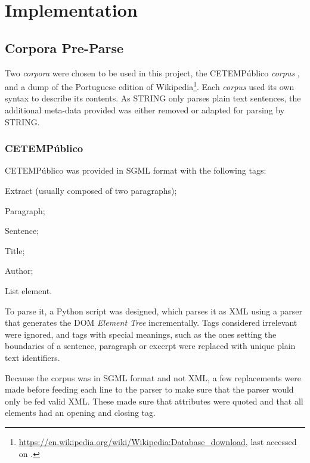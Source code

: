 \chapter{Implementation}
\label{ch:implementation}

\section{Corpora Pre-Parse}

Two \emph{corpora} were chosen to be used in this project, the CETEMPúblico 
\emph{corpus} \citep{rocha2000cetempublico}, and a dump of the Portuguese 
edition of 
Wikipedia\footnote{\url{https://en.wikipedia.org/wiki/Wikipedia:Database_download}, last accessed on .}. Each \emph{corpus} used its own 
syntax to describe its contents. As \ac{STRING} only parses plain text 
sentences, the additional meta-data provided was either removed or adapted for 
parsing by \ac{STRING}.

\subsection{CETEMPúblico}

CETEMPúblico was provided in \ac{SGML} format with the following tags:

\begin{description}[labelwidth=3em]
 \item [\texttt{ext}] Extract (usually composed of two paragraphs);
 \item [\texttt{p}]   Paragraph;
 \item [\texttt{s}]   Sentence;
 \item [\texttt{t}]   Title;
 \item [\texttt{a}]   Author;
 \item [\texttt{li}]  List element.
\end{description}

To parse it, a Python script was designed, which parses it as \ac{XML} using a
parser that generates the \ac{DOM} \emph{Element Tree} incrementally. Tags
considered irrelevant were ignored, and tags with special meanings, such as the
ones setting the boundaries of a sentence, paragraph or excerpt were replaced
with unique plain text identifiers.

Because the corpus was in \ac{SGML} format and not \ac{XML}, a few replacements
were made before feeding each line to the parser to make sure that the parser 
would only be fed valid \ac{XML}. These made sure that attributes were quoted
and that all elements had an opening and closing tag.

